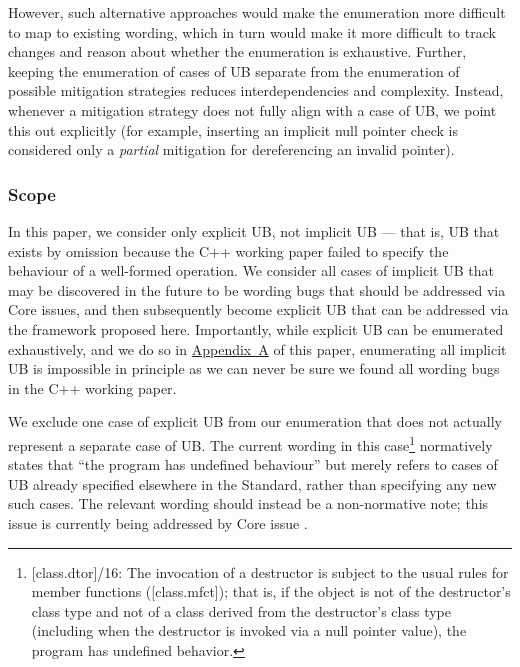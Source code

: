 However, such alternative approaches would make the enumeration more difficult to map to existing wording, which in turn would make it more difficult to track changes and reason about whether the enumeration is exhaustive. Further, keeping the enumeration of cases of UB separate from the enumeration of possible mitigation strategies reduces interdependencies and complexity. Instead, whenever a mitigation strategy does not fully align with a case of UB, we point this out explicitly (for example, inserting an implicit null pointer check is considered only a \emph{partial} mitigation for dereferencing an invalid pointer).

\subsubsection{Scope}
\label{enum_scope}

In this paper, we consider only explicit UB, not implicit UB --- that is, UB that exists by omission because the C++ working paper failed to specify the behaviour of a well-formed operation. We consider all cases of implicit UB that may be discovered in the future to be wording bugs that should be addressed via Core issues, and then subsequently become explicit UB that can be addressed via the framework proposed here. Importantly, while explicit UB can be enumerated exhaustively, and we do so in \hyperref[appendix]{Appendix~A} of this paper, enumerating all implicit UB is impossible in principle as we can never be sure we found all wording bugs in the C++ working paper.

We exclude one case of explicit UB from our enumeration that does not actually represent a separate case of UB. The current wording in this case\footnote{[class.dtor]/16: The invocation of a destructor is subject to the usual rules for member functions ([class.mfct]); that is, if the object is not of the destructor’s class type and not of a class derived from the destructor’s class type (including when the destructor is invoked via a null pointer value), the program has undefined behavior.} normatively states that ``the program has undefined behaviour'' but merely refers to cases of UB already specified elsewhere in the Standard, rather than specifying any new such cases. The relevant wording should instead be a non-normative note; this issue is currently being addressed by Core issue \cite{CWG3022}.


